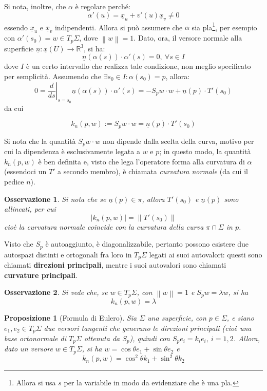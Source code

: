 \documentclass[12pt]{scrartcl}
\theoremstyle{style}
\newtheorem{prop}{Proposizione}[section]
\newtheorem{osservazione}{Osservazione}[section]
\newenvironment{boxenv}[1][]{
    \begin{eqbox}[#1]
    }{
   \end{eqbox}
}
\newcommand*\Eval[3]{\left.#1\right\rvert_{#2}^{#3}}
\numberwithin{equation}{subsection}
\renewcommand{\textbf}[1]{\textsf{\bfseries #1}}
\begin{document}
	Si nota, inoltre, che $\alpha $ \`e regolare perch\'e:
	\[
	\alpha '(u) = \underline{x}_u + v'(u) \underline{x}_v \neq 0 
	\] 
	essendo $\underline{x}_u$ e $\underline{x}_v$ indipendenti. 
Allora si pu\`o assumere che $\alpha $ sia pla\footnote{Allora si usa $s$ per la variabile in modo da evidenziare che \`e una pla.}, per esempio con $\alpha '(s_0) = w \in T_p\Sigma$, dove $\left\lVert w \right\rVert =1$.
Dato, ora, il versore normale alla superficie $\underline{n} : \underline{x}(U) \to \mathbb{R}^3$, si ha:
\[
\underline{n}(\alpha (s)) \cdot \alpha '(s) = 0 , \ \forall s \in I
\] 
dove $I$ \`e un certo intervallo che realizza tale condizione, non meglio specificato per semplicit\`a.
Assumendo che $\exists s_0 \in I : \alpha (s_0) = p$, allora:
\[
		0=\Eval{\frac{d }{d s} }{s = s_0}{} \underline{n}(\alpha (s)) \cdot \alpha '(s) = - S_p w \cdot w + \underline{n}(p) \cdot T'(s_0) 
\] 
da cui
\begin{boxenv}[]
	\begin{equation}
	 k_n(p,w):=S_p w \cdot w= \underline{n}(p) \cdot T'(s_0)
	\end{equation}
\end{boxenv}
\noindent Si nota che la quantit\`a $S_p w \cdot w$ non dipende dalla scelta della curva, motivo per cui la dipendenza \`e esclusivamente legata a $w$ e $p$; in questo modo, la quantit\`a $k_n(p,w)$ \`e ben definita e, visto che lega l'operatore forma alla curvatura di $\alpha $ (essendoci un $T'$ a secondo membro), \`e chiamata \textit{curvatura normale} (da cui il pedice $n$).
\begin{osservazione}
Si nota che se $\underline{n}(p) \in \pi$, allora $T'(s_0)$ e $\underline{n}(p)$ sono allineati, per cui 
\[
\lvert k_n(p,w) \rvert =\left\lVert T'(s_0) \right\rVert 
\] 
cio\`e la curvatura normale coincide con la curvatura della curva $\pi \cap \Sigma$ in $p$.
\end{osservazione}
\noindent Visto che $S_p$ \`e autoaggiunto, \`e diagonalizzabile, pertanto possono esistere due autospazi distinti e ortogonali fra loro in $T_p\Sigma$ legati ai suoi autovalori: questi sono chiamati \textbf{direzioni principali}, mentre i suoi autovalori sono chiamati \textbf{curvature principali}.
\begin{osservazione}
Si vede che, se $w \in T_p\Sigma$, con $\left\lVert w \right\rVert =1$ e $S_p w = \lambda w$, si ha
\[
k_n(p,w) = \lambda 
\] 
\end{osservazione}
\begin{prop}
	[Formula di Eulero]
	Sia $\Sigma$ una superficie, con $ p \in \Sigma$, e siano $e_1, e_2 \in T_p\Sigma$ due versori tangenti che generano le direzioni principali (cio\`e una base ortonormale di $T_p\Sigma$ ottenuta da $S_p$), quindi con $S_p e_i = k_i e_i ,\  i=1,2$.
	Allora, dato un versore $w \in T_p\Sigma$, si ha $w = \cos \theta e_1 + \sin \theta  e_2$ e 
	\[
	k_n(p,w) = \cos^2 \theta k_1+\sin^2 \theta k_2
	\] 
\end{prop}
\end{document}
